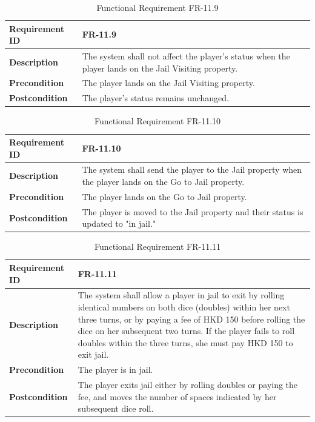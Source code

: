 \documentclass{article}
\begin{document}
\begin{table}[ht]
    \centering
    \caption{Functional Requirement FR-11.9}
    \begin{tabular}{@{}P{3cm}P{12cm}@{}}
        \toprule
        \textbf{Requirement ID} & FR-11.9 \\ \midrule
        \textbf{Description} & The system shall not affect the player's status when the player lands on the Jail Visiting property. \\ \midrule
        \textbf{Precondition} & The player lands on the Jail Visiting property. \\ \midrule
        \textbf{Postcondition} & The player's status remains unchanged. \\ \bottomrule
    \end{tabular}
\end{table}

\begin{table}[ht]
    \centering
    \caption{Functional Requirement FR-11.10}
    \begin{tabular}{@{}P{3cm}P{12cm}@{}}
        \toprule
        \textbf{Requirement ID} & FR-11.10 \\ \midrule
        \textbf{Description} & The system shall send the player to the Jail property when the player lands on the Go to Jail property. \\ \midrule
        \textbf{Precondition} & The player lands on the Go to Jail property. \\ \midrule
        \textbf{Postcondition} & The player is moved to the Jail property and their status is updated to "in jail." \\ \bottomrule
    \end{tabular}
\end{table}

\begin{table}[ht]
    \centering
    \caption{Functional Requirement FR-11.11}
    \begin{tabular}{@{}P{3cm}P{12cm}@{}}
        \toprule
        \textbf{Requirement ID} & FR-11.11 \\ \midrule
        \textbf{Description} & The system shall allow a player in jail to exit by rolling identical numbers on both dice (doubles) within her next three turns, or by paying a fee of HKD 150 before rolling the dice on her subsequent two turns. If the player fails to roll doubles within the three turns, she must pay HKD 150 to exit jail. \\ \midrule
        \textbf{Precondition} & The player is in jail. \\ \midrule
        \textbf{Postcondition} & The player exits jail either by rolling doubles or paying the fee, and moves the number of spaces indicated by her subsequent dice roll. \\ \bottomrule
    \end{tabular}
\end{table}
\end{document}
